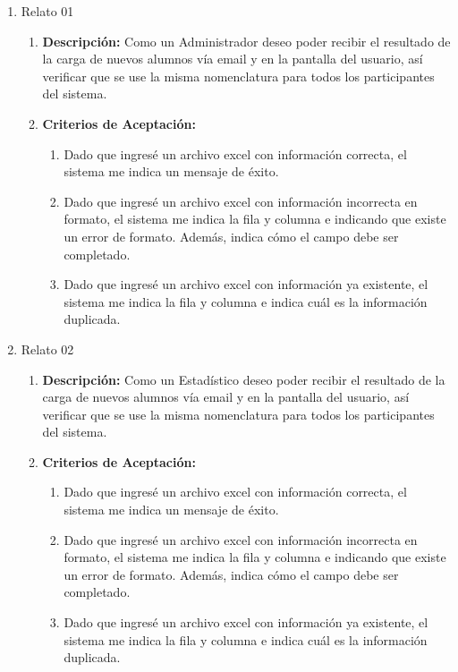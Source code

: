 \begin{enumerate}
	\item Relato 01
		\begin{enumerate}
			\item \textbf{Descripción:} Como un Administrador deseo poder recibir el resultado de la carga de nuevos alumnos vía email y en la pantalla del usuario, así verificar que se use la misma nomenclatura para todos los participantes del sistema.
			\item \textbf{Criterios de Aceptación:}
				\begin{enumerate}
					\item Dado que ingresé un archivo excel con información correcta, el sistema me indica un mensaje de éxito.
					\item Dado que ingresé un archivo excel con información incorrecta en formato, el sistema me indica la fila y columna e indicando que existe un error de formato. Además, indica cómo el campo debe ser completado.
					\item Dado que ingresé un archivo excel con información ya existente, el sistema me indica la fila y columna e indica cuál es la información duplicada.
				\end{enumerate}
		\end{enumerate}
	\item Relato 02
		\begin{enumerate}
			\item \textbf{Descripción:} Como un Estadístico deseo poder recibir el resultado de la carga de nuevos alumnos vía email y en la pantalla del usuario, así verificar que se use la misma nomenclatura para todos los participantes del sistema.
			\item \textbf{Criterios de Aceptación:}
				\begin{enumerate}
					\item Dado que ingresé un archivo excel con información correcta, el sistema me indica un mensaje de éxito.
					\item Dado que ingresé un archivo excel con información incorrecta en formato, el sistema me indica la fila y columna e indicando que existe un error de formato. Además, indica cómo el campo debe ser completado.
					\item Dado que ingresé un archivo excel con información ya existente, el sistema me indica la fila y columna e indica cuál es la información duplicada.
				\end{enumerate}
		\end{enumerate}

\end{enumerate}
